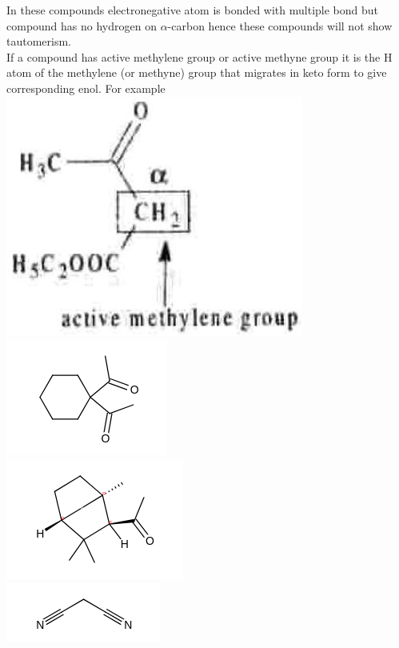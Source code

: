 \documentclass[10pt]{article}
\begin{document}
In these compounds electronegative atom is bonded with multiple bond but compound has no hydrogen on $\alpha$-carbon hence these compounds will not show tautomerism.\\
If a compound has active methylene group or active methyne group it is the H atom of the methylene (or methyne) group that migrates in keto form to give corresponding enol. For example\\
\includegraphics[max width=\textwidth, center]{2025_01_28_8470952b98110cec3aabg-043}\\
\includegraphics{smile-e9a58e082bdefb223f4ab64c9ff724d8f271f51b}\\
\includegraphics{smile-e363219b73efc93a0ed7001993e28ec55acac7ab}\\
\includegraphics{smile-ee6ac695e152521bfc8ec85448f0c59f5b2a9a93}
\end{document}
